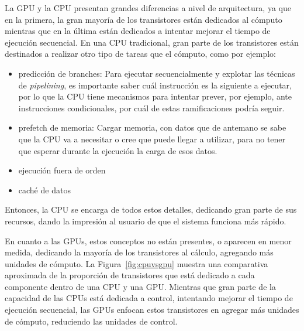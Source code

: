 La GPU y la CPU presentan grandes diferencias a nivel de arquitectura, ya que en la primera, la gran mayoría de los transistores están dedicados al cómputo mientras que en la última están dedicados a intentar mejorar el tiempo de ejecución secuencial. En una CPU tradicional, gran parte de los transistores están destinados a realizar otro tipo de tareas que el cómputo, como por ejemplo: 

\begin{itemize}
    \item predicción de branches: Para ejecutar secuencialmente y explotar las técnicas de \textit{pipelining}, es importante saber cuál instrucción es la siguiente a ejecutar, %
    por lo que la CPU tiene mecanismos para intentar prever, por ejemplo, ante instrucciones condicionales, por cuál de estas ramificaciones podría seguir.
    \item prefetch de memoria: Cargar memoria, con datos que de antemano se sabe que la CPU va a necesitar o cree que puede llegar a utilizar, para no tener que esperar durante la ejecución la carga de esos datos.
    
    \item ejecución fuera de orden
    
    \item caché de datos
\end{itemize}

Entonces, la CPU se  encarga de todos estos detalles, dedicando gran parte de sus recursos, dando la impresión al usuario de que el sistema funciona más rápido.

En cuanto a las GPUs, estos conceptos no están presentes, o aparecen en menor medida,  dedicando la mayoría de los transistores al cálculo, agregando más unidades de cómputo. La Figura~\ref{fig:cpuvsgpu} muestra una comparativa aproximada de la proporción de transistores que está dedicado a cada componente dentro de una CPU y una GPU. Mientras que gran parte de la capacidad de las CPUs está dedicada a control, intentando mejorar el tiempo de ejecución secuencial, las GPUs enfocan estos transistores en agregar más unidades de cómputo, reduciendo las unidades de control. 


